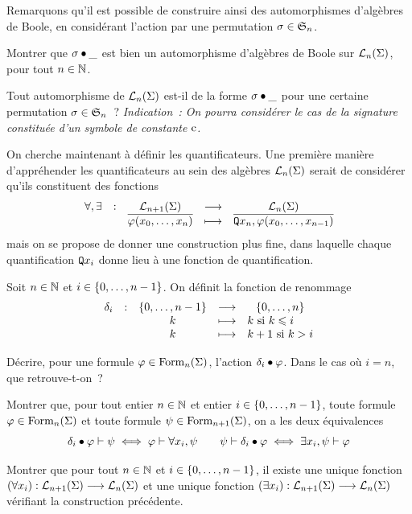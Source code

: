 \begin{problem}
  Remarquons qu'il est possible de construire ainsi des automorphismes
  d'algèbres de Boole, en considérant l'action par une permutation
  $\sigma\in\mathfrak{S}_{n}$.
  \begin{pbQuest}[resume]
  \item Montrer que $\sigma\mathbin{\bullet}\mathord{\_}$ est bien un automorphisme d'algèbres
    de Boole sur $\mathcal{L}_n(\Sigma)$, pour tout $n \in \mathbb N$.
  \item Tout automorphisme de $\mathcal{L}_n(\Sigma)$ est-il de la forme
    $\sigma\mathbin{\bullet}\mathord{\_}$ pour une certaine permutation
    $\sigma\in\mathfrak{S}_{n}$~? \textit{Indication~: On pourra considérer le cas
    de la signature constituée d'un symbole de constante $\mathrm{c}$.}
  \end{pbQuest}


  On cherche maintenant à définir les quantificateurs. Une première manière
  d'appréhender les quantificateurs au sein des algèbres $\mathcal{L}_n(\Sigma)$
  serait de considérer qu'ils constituent des fonctions
  \[
  \makeFun
      {\mathord{\forall},\mathord{\exists}}
      {\LinTar_{n+1}(\Sign)}{\LinTar_n(\Sign)}
      {\clas{\varFF(x_0,\ldots,x_n)}}
      {\clas{\quantif x_n,\varFF(x_0,\ldots,x_{n-1})}}
      \]
  mais on se propose de donner une construction plus fine, dans laquelle chaque
  quantification ${\normalfont\texttt{Q}} x_i$ donne lieu à une fonction de quantification.

  Soit $n \in \mathbb N$ et $i \in \{0,\ldots,n - 1\}$. On définit la fonction de
  renommage
  \[
  \makeFunBis{\delta_{i}}{\intervInt{n}}{\intervP{0}{n}}
             {k}{k\text{ si } k \leq i}
             {k}{k+1\text{ si } k > i}
  \]
  \begin{pbQuest}
  \item Décrire, pour une formule $\varphi\in\operatorname{Form}_{n}(\Sigma)$, l'action
    $\delta_{i}\mathbin{\bullet}\varphi$. Dans le cas où $i = n$, que retrouve-t-on~?
  \item Montrer que, pour tout entier $n \in \mathbb N$ et entier $i\in\{0,\ldots,n - 1\}$,
    toute formule $\varphi\in\operatorname{Form}_n(\Sigma)$ et toute formule
    $\psi\in\operatorname{Form}_{n+1}(\Sigma)$, on a les deux équivalences
    \[\delta_i\mathbin{\bullet}\varphi\vdash\psi \iff \varphi \vdash \forall x_i,\psi
    \qquad
    \psi\vdash\delta_i\mathbin{\bullet}\varphi\iff \exists x_i,\psi\vdash\varphi\]
  \item Montrer que pour tout $n \in \mathbb N$ et $i \in \{0,\ldots,n - 1\}$, il existe
    une unique fonction
    $(\forall x_i) : \displaystyle \mathcal{L}_{n+1}(\Sigma) \longrightarrow \mathcal{L}_n(\Sigma)$
    et une unique fonction
    $(\exists x_i) : \displaystyle \mathcal{L}_{n+1}(\Sigma) \longrightarrow \mathcal{L}_n(\Sigma)$
    vérifiant la construction précédente.
  \end{pbQuest}


\end{problem}
